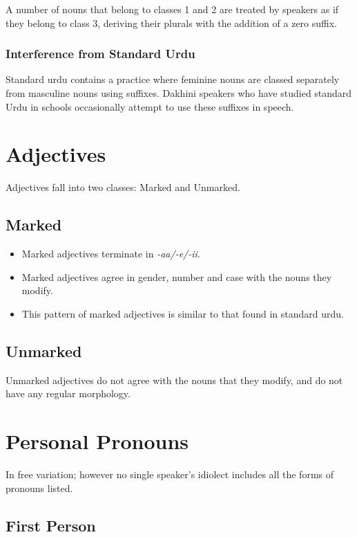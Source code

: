 \documentclass[a4paper]{article}
\begin{document}
A number of nouns that belong to classes 1 and 2 are treated by speakers as if they belong to class 3, deriving their plurals with the addition of a zero suffix.

\subsubsection{Interference from Standard Urdu}

Standard urdu contains a practice where feminine nouns are classed separately from masculine nouns using suffixes. Dakhini speakers who have studied standard Urdu in schools occasionally attempt to use these suffixes in speech.

\section{Adjectives}

Adjectives fall into two classes: Marked and Unmarked.

\subsection{Marked}

\begin{itemize}
\item
Marked adjectives terminate in \emph{-aa/-e/-ii}.
\item
Marked adjectives agree in gender, number and case with the nouns they modify.
\item
This pattern of marked adjectives is similar to that found in standard urdu.
\end{itemize}

\subsection{Unmarked}

Unmarked adjectives do not agree with the nouns that they modify, and do not have any regular morphology.

\section{Personal Pronouns}

In free variation; however no single speaker's idiolect includes all the forms of pronouns listed.

\subsection{First Person}
\end{document}
